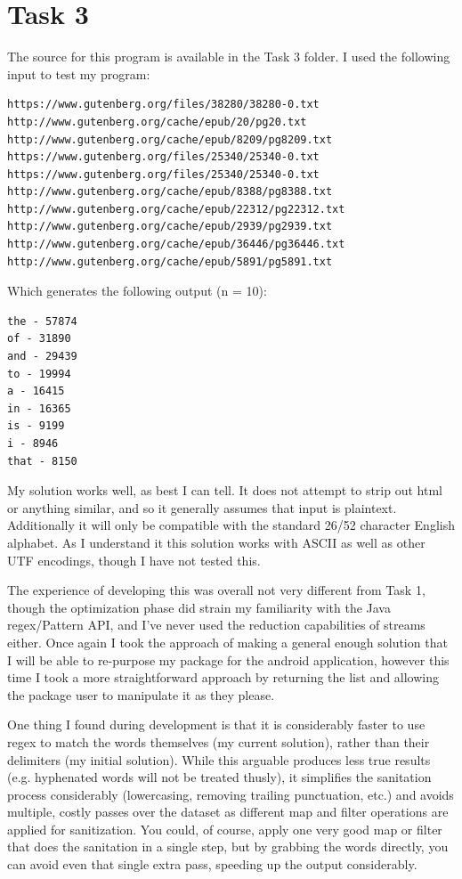 \documentclass[11pt]{article}
\begin{document}
	\section{Task 3}
	The source for this program is available in the Task 3 folder. I used the following input to test my program:
\begin{verbatim}
https://www.gutenberg.org/files/38280/38280-0.txt
http://www.gutenberg.org/cache/epub/20/pg20.txt
http://www.gutenberg.org/cache/epub/8209/pg8209.txt
https://www.gutenberg.org/files/25340/25340-0.txt
https://www.gutenberg.org/files/25340/25340-0.txt
http://www.gutenberg.org/cache/epub/8388/pg8388.txt
http://www.gutenberg.org/cache/epub/22312/pg22312.txt
http://www.gutenberg.org/cache/epub/2939/pg2939.txt
http://www.gutenberg.org/cache/epub/36446/pg36446.txt
http://www.gutenberg.org/cache/epub/5891/pg5891.txt
\end{verbatim}
Which generates the following output (n = 10):
\begin{verbatim}
the - 57874
of - 31890
and - 29439
to - 19994
a - 16415
in - 16365
is - 9199
i - 8946
that - 8150
\end{verbatim}

My solution works well, as best I can tell. It does not attempt to strip out html or anything similar, and so it generally assumes that input is plaintext. Additionally it will only be compatible with the standard 26/52 character English alphabet. As I understand it this solution works with ASCII as well as other UTF encodings, though I have not tested this.

The experience of developing this was overall not very different from Task 1, though the optimization phase did strain my familiarity with the Java regex/Pattern API, and I've never used the reduction capabilities of streams either. Once again I took the approach of making a general enough solution that I will be able to re-purpose my package for the android application, however this time I took a more straightforward approach by returning the list and allowing the package user to manipulate it as they please.

One thing I found during development is that it is considerably faster to use regex to match the words themselves (my current solution), rather than their delimiters (my initial solution). While this arguable produces less true results (e.g. hyphenated words will not be treated thusly), it simplifies the sanitation process considerably (lowercasing, removing trailing punctuation, etc.) and avoids multiple, costly passes over the dataset as different map and filter operations are applied for sanitization. You could, of course, apply one very good map or filter that does the sanitation in a single step, but by grabbing the words directly, you can avoid even that single extra pass, speeding up the output considerably.
\end{document}
